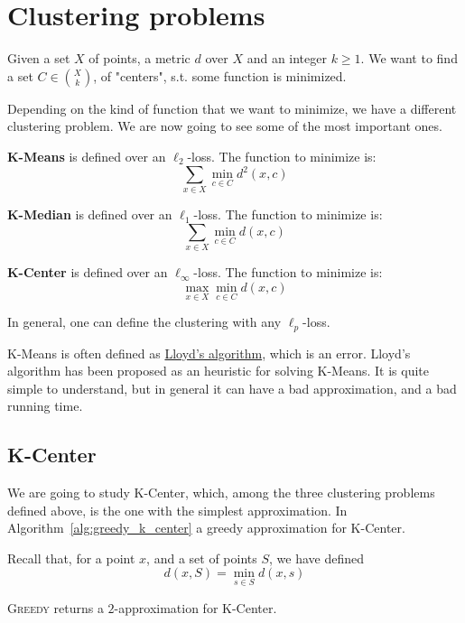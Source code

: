 \section{Clustering problems}

Given a set $X$ of points, a metric $d$ over $X$ and an integer $k \geq 1$.
We want to find a set $C \in \binom{X}{k}$, of "centers", s.t. some function is minimized.

Depending on the kind of function that we want to minimize, we have a different clustering problem.
We are now going to see some of the most important ones.

\textbf{K-Means} is defined over an $\ell_2$-loss. The function to minimize is:
\[ \sum_{x \in X} \min_{c \in C} d^2(x,c) \]

\textbf{K-Median} is defined over an $\ell_1$-loss. The function to minimize is:
\[ \sum_{x \in X} \min_{c \in C} d(x,c) \]

\textbf{K-Center} is defined over an $\ell_\infty$-loss. The function to minimize is:
\[ \max_{x \in X} \min_{c \in C} d(x,c) \]

In general, one can define the clustering with any $\ell_p$-loss.

K-Means is often defined as \href{https://en.wikipedia.org/wiki/Lloyd%27s_algorithm}{Lloyd's algorithm}, which is an error.
Lloyd's algorithm has been proposed as an heuristic for solving K-Means. It is quite simple to understand, but in general it can have a bad approximation, and a bad running time.

\subsection{K-Center}
    We are going to study K-Center, which, among the three clustering problems defined above, is the one with the simplest approximation.
    In Algorithm~\ref{alg:greedy_k_center} a greedy approximation for K-Center.

    Recall that, for a point $x$, and a set of points $S$, we have defined
    \[ d(x,S) = \min_{s \in S} d(x,s) \]

    

    \begin{theorem}
        \textsc{Greedy} returns a $2$-approximation for K-Center.
    \end{theorem}

